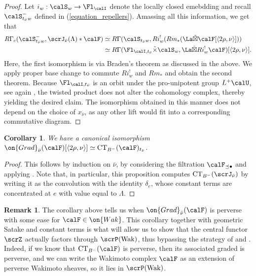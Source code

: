 \documentclass[10pt, reqno]{amsart}
\theoremstyle{plain}
\newtheorem{corollary}[theorem]{Corollary}
\theoremstyle{definition}
\newtheorem{remark}[theorem]{Remark}
\numberwithin{equation}{section}
\begin{document}
\begin{proof}
		
		Let $i_w:\calS_w\rightarrow \Fl_\calI$ denote the locally closed emebdding and recall $\calS^-_{t_{\bar \nu}w}$  defined in (\ref{equation_repellers}). Amassing all this information, we get that
		\begin{align}
			\begin{split}
				R\Gamma_c(\calS^-_{t_{\bar \nu}w}, \scrJ_{\bar \nu}(\Lambda) \ast \calF) & \simeq R\Gamma(\calS_{t_{\bar\nu}w},Ri_w^!( Rm_* (\La \tilde{\boxtimes}  \calF [\langle 2\rho, \nu\rangle ])) \\         
				& \simeq R\Gamma(\Fl_{\calI,t_{\bar\nu}}\tilde{\times} \calS_w, \La \tilde{\boxtimes} Ri_w^!\calF) [\langle 2\rho, \nu\rangle ].
			\end{split}
		\end{align}
		Here, the first isomorphism is via Braden's theorem as discussed in the above. We apply proper base change to commute $Ri_w^!$ and $Rm_*$ and obtain the second theorem. Because $\Fl_{\calI,t_{\bar \nu}}$ is an orbit under the pro-unipotent group $L^+\calU$, see again , the twisted product does not alter the cohomology complex, thereby yielding the desired claim. The isomorphism obtained in this manner does not depend on the choice of $x_{\bar \nu}$, as any other lift would fit into a corresponding commutative diagram.
	\end{proof}
	
	\begin{corollary}\label{coro_wakimoto_graded_ct} 
		We have a canonical isomorphism $\on{Grad}_{\bar \nu}(\calF)[\langle 2\rho, \nu \rangle ] \simeq \mathrm{CT}_{B^-}( \calF)_{t_{\bar \nu}}$.
	\end{corollary}
	\begin{proof}
		This follows by induction on $\bar \nu$, by considering the filtration $\calF_{\preceq\bullet}$ and applying . Note that, in particular, this proposition computes $\mathrm{CT}_{B^-}(\scrJ_{\bar \nu})$ by writing it as the convolution with the identity $\delta_e$, whose constant terms are concentrated at $e$ with value equal to $\Lambda$.
	\end{proof}
	
	\begin{remark}
		The corollary above tells us when $\on{Grad}_{\bar \nu}(\calF)$ is perverse with some ease for $\calF \in \on{Wak}$. This corollary together with geometric Satake and constant terms is what will allow us to show that the central functor $\scrZ$ actually factors through $\scrP(\mathrm{Wak})$, thus bypassing the strategy of \cite[Theorem 4, Proposition 5]{AB09} and \cite[Proposition 4.4.1]{AR}. Indeed, if we know that $\mathrm{CT}_{B^-}(\calF)$ is perverse, then its associated graded is perverse, and we can write the Wakimoto complex $\calF$ as an extension of perverse Wakimoto sheaves, so it lies in $\scrP(\mathrm{Wak})$.
	\end{remark}
	
\end{document}
